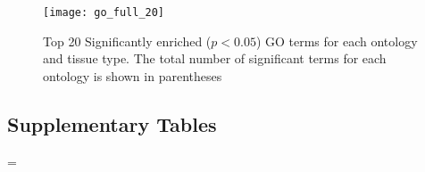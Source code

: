 \documentclass[11pt]{article}
\begin{document}
\begin{figure}[t]
  \centering
  \texttt{[image: go\_full\_20]}
  \caption{Top 20 Significantly enriched ($p < 0.05$) GO terms for
    each ontology and tissue type. The total number of significant
    terms for each ontology is shown in parentheses}
  \label{fig:go_tissue}
\end{figure}
 
\clearpage

\subsection*{Supplementary Tables}\label{ss:supp-tab}

\newdimen\LTcapwidth \LTcapwidth=\textwidth
  
\clearpage

\clearpage

\clearpage
  
\clearpage

\clearpage

\end{document}

